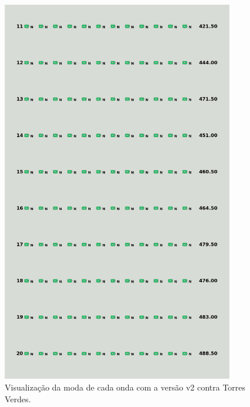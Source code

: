 \begin{figure}[H]
  \centering
  \includegraphics[width=0.9\textwidth]{figuras/td/td_allgreen_ai_mode_2_2.png}
  \caption{Visualização da moda de cada onda com a versão v2 contra Torres Verdes.}
  \label{fig:td-moda-green-2-2}
\end{figure}

